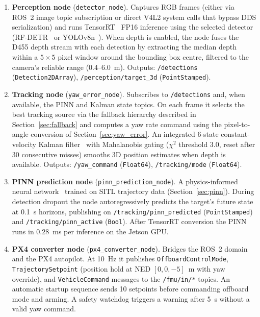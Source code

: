 \documentclass[11pt,letterpaper]{article}
\begin{document}
\begin{enumerate}
    \item \textbf{Perception node} (\texttt{detector\_node}).  Captures RGB frames (either via ROS~2 image topic subscription or direct V4L2 system calls that bypass DDS serialization) and runs TensorRT~\cite{tensorrt} FP16 inference using the selected detector (RF-DETR~\cite{rfdetr2025} or YOLOv8n~\cite{ultralytics2023}).  When depth is enabled, the node fuses the D455 depth stream with each detection by extracting the median depth within a $5\times5$ pixel window around the bounding box centre, filtered to the camera's reliable range (0.4--6.0~m).  Outputs: \texttt{/detections} (\texttt{Detection2DArray}), \texttt{/perception/target\_3d} (\texttt{PointStamped}).

    \item \textbf{Tracking node} (\texttt{yaw\_error\_node}).  Subscribes to \texttt{/detections} and, when available, the PINN and Kalman state topics.  On each frame it selects the best tracking source via the fallback hierarchy described in Section~\ref{sec:fallback} and computes a yaw rate command using the pixel-to-angle conversion of Section~\ref{sec:yaw_error}.  An integrated 6-state constant-velocity Kalman filter~\cite{kalmanfilter1960} with Mahalanobis gating ($\chi^2$ threshold 3.0, reset after 30 consecutive misses) smooths 3D position estimates when depth is available.  Outputs: \texttt{/yaw\_command} (\texttt{Float64}), \texttt{/tracking/mode} (\texttt{Float64}).

    \item \textbf{PINN prediction node} (\texttt{pinn\_prediction\_node}).  A physics-informed neural network~\cite{raissi2019pinn} trained on SITL trajectory data (Section~\ref{sec:pinn}).  During detection dropout the node autoregressively predicts the target's future state at 0.1~s horizons, publishing on \texttt{/tracking/pinn\_predicted} (\texttt{PointStamped}) and \texttt{/tracking/pinn\_active} (\texttt{Bool}).  After TensorRT conversion the PINN runs in 0.28~ms per inference on the Jetson GPU.

    \item \textbf{PX4 converter node} (\texttt{px4\_converter\_node}).  Bridges the ROS~2 domain and the PX4 autopilot.  At 10~Hz it publishes \texttt{OffboardControlMode}, \texttt{TrajectorySetpoint} (position hold at NED $[0,0,-5]$~m with yaw override), and \texttt{VehicleCommand} messages to the \texttt{/fmu/in/*} topics.  An automatic startup sequence sends 10 setpoints before commanding offboard mode and arming.  A safety watchdog triggers a warning after 5~s without a valid yaw command.
\end{enumerate}
\end{document}
